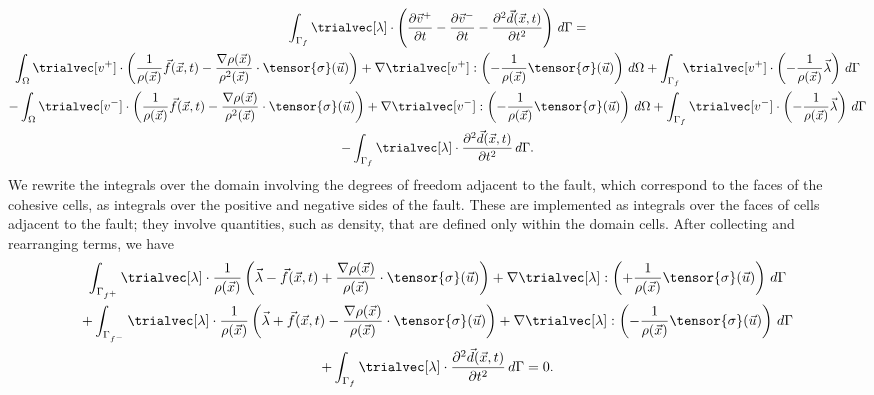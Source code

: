 \begin{multline}
  \int_{\Gamma_f} \trialvec[\lambda] \cdot \left(
    \frac{\partial \vec{v}^+}{\partial t} - \frac{\partial \vec{v}^-}{\partial t} -
    \frac{\partial^2 \vec{d}(\vec{x},t)}{\partial t^2} \right) \, d\Gamma = \\
  \int_\Omega \trialvec[v^+] \cdot \left( \frac{1}{\rho(\vec{x})} \vec{f}(\vec{x}, t)
    -\frac{\nabla \rho(\vec{x})}{\rho^2(\vec{x})} \cdot \tensor{\sigma}(\vec{u}) \right) 
  + \nabla \trialvec[v^+] : \left(-\frac{1}{\rho(\vec{x})} \tensor{\sigma}(\vec{u}) \right) \, d\Omega
  + \int_{\Gamma_f} \trialvec[v^+] \cdot \left(-\frac{1}{\rho(\vec{x})} \vec{\lambda} \right) \, d\Gamma \\
  - \int_\Omega \trialvec[v^-] \cdot \left( \frac{1}{\rho(\vec{x})} \vec{f}(\vec{x}, t)
  -\frac{\nabla \rho(\vec{x})}{\rho^2(\vec{x})} \cdot \tensor{\sigma}(\vec{u}) \right)
  + \nabla \trialvec[v^-] : \left(-\frac{1}{\rho(\vec{x})} \tensor{\sigma}(\vec{u}) \right) \, d\Omega
  + \int_{\Gamma_f} \trialvec[v^-] \cdot \left(-\frac{1}{\rho(\vec{x})} \vec{\lambda} \right) \, d\Gamma \\
  - \int_{\Gamma_f} \trialvec[\lambda] \cdot \frac{\partial^2 \vec{d}(\vec{x}, t)}{\partial t^2} \, d\Gamma.
\end{multline}
We rewrite the integrals over the domain involving the degrees of
freedom adjacent to the fault, which correspond to the faces of the cohesive cells, as integrals over the positive and
negative sides of the fault. These are implemented as integrals over
the faces of cells adjacent to the fault; they involve quantities,
such as density, that are defined only within the domain cells. After
collecting and rearranging terms, we have
\begin{multline}
  \label{eqn:elasticity:prescribed:slip:dynamic:DAE:weak:form}
  \int_{\Gamma_{f^+}} \trialvec[\lambda] \cdot \frac{1}{\rho(\vec{x})} \left(
    \vec{\lambda} - \vec{f}(\vec{x},t) + \frac{\nabla\rho(\vec{x})}{\rho(\vec{x})} \cdot \tensor{\sigma}(\vec{u}) \right)
  + \nabla \trialvec[\lambda] : \left(+\frac{1}{\rho(\vec{x})} \tensor{\sigma}(\vec{u}) \right) \, d\Gamma \\
  + \int_{\Gamma_{f^-}} \trialvec[\lambda] \cdot \frac{1}{\rho(\vec{x})} \left(
    \vec{\lambda} + \vec{f}(\vec{x},t) - \frac{\nabla\rho(\vec{x})}{\rho(\vec{x})} \cdot \tensor{\sigma}(\vec{u}) \right)
  + \nabla \trialvec[\lambda] : \left(-\frac{1}{\rho(\vec{x})} \tensor{\sigma}(\vec{u}) \right)  \, d\Gamma \\
  + \int_{\Gamma_f} \trialvec[\lambda] \cdot \frac{\partial^2 \vec{d}(\vec{x}, t)}{\partial t^2} \, d\Gamma
  = 0.
\end{multline}


